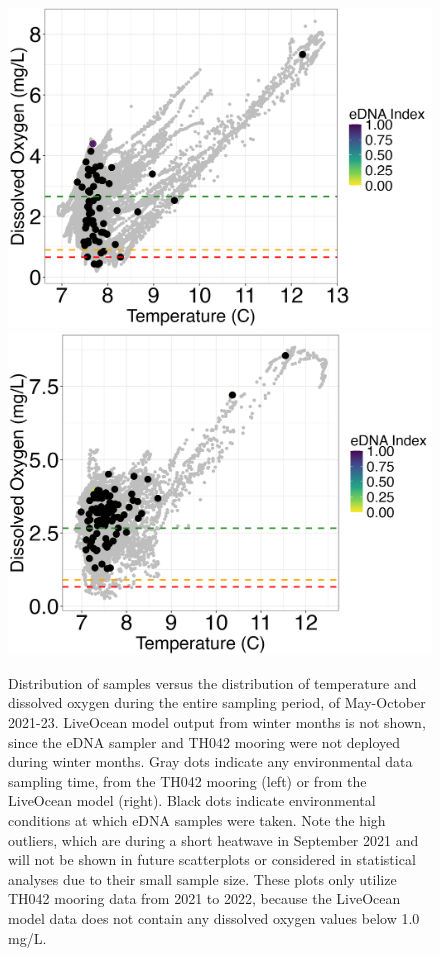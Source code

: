 \documentclass[12pt,twoside]{reedthesis}
\begin{document}
	\begin{figure}[!h]
		\begin{center}
			\includegraphics[scale=0.35]{Scatter_ex}
			\includegraphics[scale=0.35]{Scatter_ex_Mod}
			\caption[Mooring vs. model]{Distribution of samples versus the distribution of temperature and dissolved oxygen during the entire sampling period, of May-October 2021-23. LiveOcean model output from winter months is not shown, since the eDNA sampler and TH042 mooring were not deployed during winter months. Gray dots indicate any environmental data sampling time, from the TH042 mooring (left) or from the LiveOcean model (right). Black dots indicate environmental conditions at which eDNA samples were taken. Note the high outliers, which are during a short heatwave in September 2021 and will not be shown in future scatterplots or considered in statistical analyses due to their small sample size. These plots only utilize TH042 mooring data from 2021 to 2022, because the LiveOcean model data does not contain any dissolved oxygen values below 1.0 mg/L.} %
		\end{center}
		\label{EnvironmentalConditions}
	\end{figure} 
	
\end{document}
